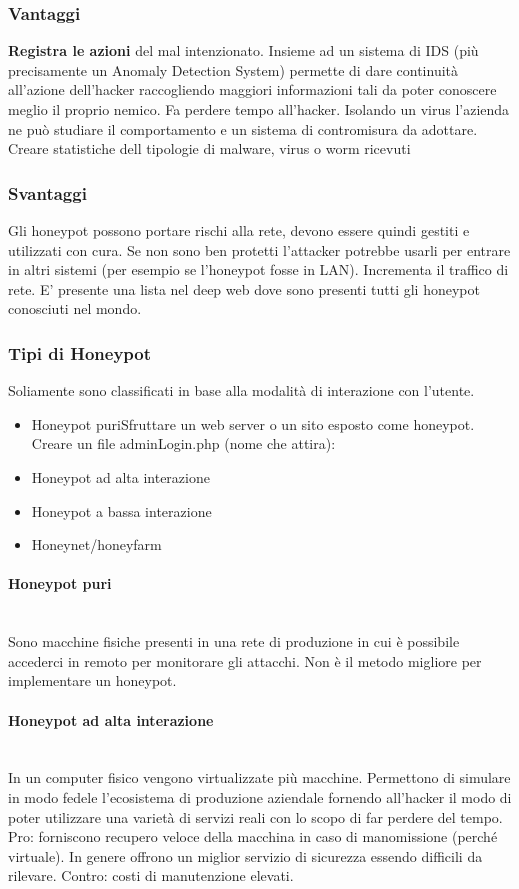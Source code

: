 \documentclass[8pt]{extarticle}
\begin{document}
\subsubsection{Vantaggi}
\noindent
\textbf{Registra le azioni} del mal intenzionato. Insieme ad un sistema di IDS (più precisamente un Anomaly 
Detection System) permette di dare continuità all’azione dell’hacker raccogliendo maggiori informazioni 
tali da poter conoscere meglio il proprio nemico. Fa perdere tempo all’hacker. Isolando un virus 
l’azienda ne può studiare il comportamento e un sistema di contromisura da adottare. 
Creare statistiche dell tipologie di malware, virus o worm ricevuti
\subsubsection{Svantaggi}
Gli honeypot possono portare rischi alla rete, devono essere quindi gestiti e utilizzati con cura. 
Se non sono ben protetti l’attacker potrebbe usarli per entrare in altri sistemi (per esempio se l’honeypot fosse in LAN).
Incrementa il traffico di rete.
E’ presente una lista nel deep web dove sono presenti tutti gli honeypot conosciuti nel mondo.
\subsubsection{Tipi di Honeypot}
\noindent
Soliamente sono classificati in base alla modalità di interazione con l’utente.
\begin{itemize}
    \item Honeypot puriSfruttare un web server o un sito esposto come honeypot. Creare un file adminLogin.php (nome che attira):
    \item Honeypot ad alta interazione 
    \item Honeypot a bassa interazione
    \item Honeynet/honeyfarm
\end{itemize}
\paragraph{Honeypot puri}
\noindent
\\
Sono macchine fisiche presenti in una rete di produzione in cui è possibile accederci in remoto per monitorare gli attacchi. 
Non è il metodo migliore per implementare un honeypot.
\paragraph{Honeypot ad alta interazione}
\noindent
\\
In un computer fisico vengono virtualizzate più macchine. Permettono di simulare in modo fedele l’ecosistema di produzione 
aziendale fornendo all’hacker il modo di poter utilizzare una varietà di servizi reali con lo scopo di far perdere del tempo.
Pro: forniscono recupero veloce della macchina in caso di manomissione (perché virtuale). In genere offrono un miglior 
servizio di sicurezza essendo difficili da rilevare. Contro: costi di manutenzione elevati.
\end{document}
